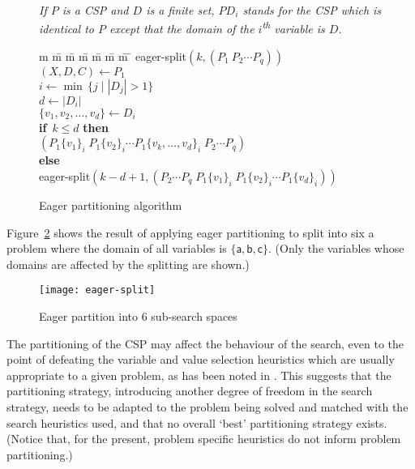 \documentclass{llncs}
\newenvironment{notation}{\trivlist\item[\hskip \labelsep{\bfseries Notation}]\itshape}{\endtrivlist}
\newcommand{\IF}{\textbf{\sffamily if}}
\newcommand{\THEN}{\textbf{\sffamily then}}
\newcommand{\ELSE}{\textbf{\sffamily else}}
\begin{document}
\begin{figure}[ht]
  {
    \normalsize
    \begin{notation}
      If $P$ is a CSP and $D$ is a finite set, $PD_i$ stands for the
      CSP which is identical to $P$ except that the domain of the
      $i$\textsuperscript{th} variable is $D$.
    \end{notation}
  }
  {
    \sffamily
    \begin{tabbing}
      m \= m \= m \= m \= m \= m \= m \= \kill
      eager-split$(k, (P_1 \: P_2 \cdots P_q))$ \+ \\
      $(X, D, C) \leftarrow P_1$ \\
      $i \leftarrow \min \, \{ j \mid |D_j| > 1 \}$ \\
      $d \leftarrow |D_i|$ \\
      $\{v_1, v_2, \ldots, v_d\} \leftarrow D_i$ \\
      \IF\ $k \le d$ \THEN \+ \\
        $(P_1\{v_1\}_i \; P_1\{v_2\}_i \cdots P_1\{v_k, \ldots, v_d\}_i \; P_2 \cdots P_q)$ \- \\
      \ELSE \+ \\
        eager-split$(k-d+1, (P_2 \cdots P_q \; P_1\{v_1\}_i \; P_1\{v_2\}_i \cdots P_1\{v_d\}_i))$
    \end{tabbing}
  }
  \caption{Eager partitioning algorithm}
  \label{algo:eager}
\end{figure}

Figure~\ref{fig:eager} shows the result of applying eager partitioning
to split into six a problem where the domain of all variables is
$\{\textsf{a}, \mathsf{b}, \mathsf{c}\}$. (Only the variables whose
domains are affected by the splitting are shown.)

\begin{figure}[h]
  \centering
  \texttt{[image: eager-split]}
  \caption{Eager partition into 6 sub-search spaces}
  \label{fig:eager}
\end{figure}

The partitioning of the CSP may affect the behaviour of the search,
even to the point of defeating the variable and value selection
heuristics which are usually appropriate to a given problem, as has
been noted in \cite[Section~6]{hent07:parallel-CSP}. This suggests
that the partitioning strategy, introducing another degree of freedom
in the search strategy, needs to be adapted to the problem being
solved and matched with the search heuristics used, and that no
overall `best' partitioning strategy exists. (Notice that, for the
present, problem specific heuristics do not inform problem
partitioning.)
\end{document}
